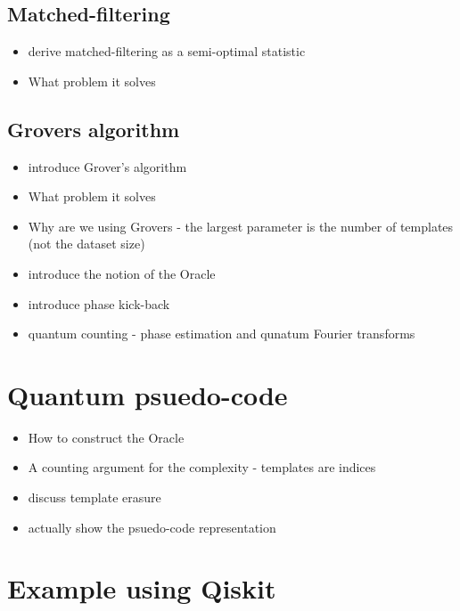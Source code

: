 \documentclass[aps,prd,nofootinbib,twocolumn,reprint,superscriptaddress,showpacs,showkeys,longbibliography]{revtex4-1}
\begin{document}
\subsection{Matched-filtering}

\begin{itemize}
\item derive matched-filtering as a semi-optimal statistic
\item What problem it solves
\end{itemize}

\subsection{Grovers algorithm}

\begin{itemize}
\item introduce Grover's algorithm
\item What problem it solves
\item Why are we using Grovers - the largest parameter is the number of
templates (not the dataset size)
\item introduce the notion of the Oracle
\item introduce phase kick-back
\item quantum counting - phase estimation and qunatum Fourier transforms
\end{itemize}

\section{Quantum psuedo-code}\label{sec:psuedocode}

\begin{itemize}
\item How to construct the Oracle
\item A counting argument for the complexity - templates are indices
\item discuss template erasure
\item actually show the psuedo-code representation
\end{itemize}

\section{Example using Qiskit}\label{sec:qizkitexample}
\end{document}
